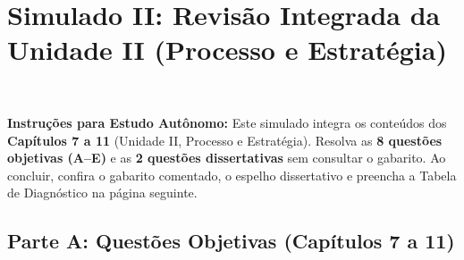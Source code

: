 \clearpage
{}
{}
\chapter*{Simulado II: Revisão Integrada da Unidade II (Processo e Estratégia)}

\noindent{} \tagQuant\ \tagTerritorio

\begin{tcolorbox}[colback=bgSoft, colframe=etIndigo, arc=3pt, boxrule=0.7pt, left=10pt, right=10pt, top=7pt, bottom=7pt]
  \textbf{Instruções para Estudo Autônomo:} Este simulado integra os conteúdos dos \textbf{Capítulos 7 a 11} (Unidade II, Processo e Estratégia). Resolva as \textbf{8 questões objetivas (A–E)} e as \textbf{2 questões dissertativas} sem consultar o gabarito. Ao concluir, confira o gabarito comentado, o espelho dissertativo e preencha a Tabela de Diagnóstico na página seguinte.
\end{tcolorbox}

\section*{Parte A: Questões Objetivas (Capítulos 7 a 11)}

